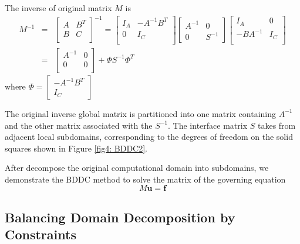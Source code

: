 The inverse of original matrix $ M $ is 
\begin{eqnarray} \label{eq:schur}
M^{-1} &=& \begin{bmatrix}
A & B^{T} \\
B & C\\
\end{bmatrix}^{-1} =
\begin{bmatrix}
I_{A} &  -A^{-1}B^{T} \\ 0 & I_{C}\\
\end{bmatrix} \begin{bmatrix}
A^{-1}& 0 \\ 0 & S^{-1}
\end{bmatrix}
\begin{bmatrix}
I_{A} & 0 \\ -BA^{-1} & I_{C} \\
\end{bmatrix}\\
&=& \begin{bmatrix}
A^{-1} & 0 \\ 0 & 0 \\
\end{bmatrix} + \Phi S^{-1} \Phi^{T}
\end{eqnarray}
where $ \Phi =\begin{bmatrix}
-A^{-1}B^{T} \\ I_{C}
\end{bmatrix} $

The original inverse global matrix  is partitioned into one matrix containing $ A^{-1} $ and the other matrix associated with the $ S^{-1} $. The interface matrix $ S $ takes from adjacent local subdomains, corresponding to the degrees of freedom on the solid squares shown in Figure \ref{fig4: BDDC2}. 

After decompose the original computational domain into subdomains, we demonstrate the BDDC method to solve the matrix of the governing equation 
\begin{equation}
{M}\mathbf{u} = \mathbf{f}
\end{equation}


\subsection{Balancing Domain Decomposition by Constraints}

